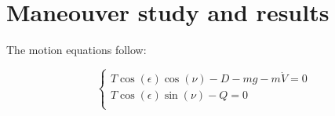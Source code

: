 \section*{Maneouver study and results}
The motion equations follow:

\begin{equation}
	\begin{cases}
	T\cos(\epsilon)\cos(\nu) - D -mg-m\dot{V}=0\\
	T\cos(\epsilon)\sin(\nu) - Q=0\\
		\end{cases}
\end{equation}